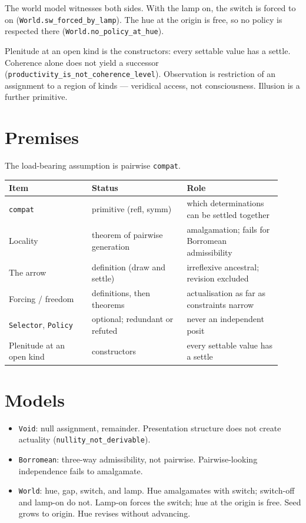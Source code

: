 \documentclass[11pt]{article}
\theoremstyle{definition}
\newcommand{\lean}[1]{\nolinkurl{#1}}
\begin{document}
The world model witnesses both sides. With the lamp on, the switch is
forced to on (\lean{World.sw\_forced\_by\_lamp}). The hue at the origin
is free, so no policy is respected there
(\lean{World.no\_policy\_at\_hue}).

Plenitude at an open kind is the constructors: every settable value has
a settle. Coherence alone does not yield a successor
(\lean{productivity\_is\_not\_coherence\_level}). Observation is
restriction of an assignment to a region of kinds --- veridical
access, not consciousness. Illusion is a further primitive.

\section{Premises}

The load-bearing assumption is pairwise \lean{compat}.

\begin{center}
\small
\begin{tabular}{@{}>{\raggedright\arraybackslash}p{0.28\linewidth}
  >{\raggedright\arraybackslash}p{0.32\linewidth}
  >{\raggedright\arraybackslash}p{0.32\linewidth}@{}}
\toprule
Item & Status & Role \\
\midrule
\lean{compat}
  & primitive (refl, symm)
  & which determinations can be settled together \\
Locality
  & theorem of pairwise generation
  & amalgamation; fails for Borromean admissibility \\
The arrow
  & definition (draw and settle)
  & irreflexive ancestral; revision excluded \\
Forcing / freedom
  & definitions, then theorems
  & actualisation as far as constraints narrow \\
\lean{Selector}, \lean{Policy}
  & optional; redundant or refuted
  & never an independent posit \\
Plenitude at an open kind
  & constructors
  & every settable value has a settle \\
\bottomrule
\end{tabular}
\end{center}

\section{Models}

\begin{itemize}
  \item \lean{Void}: null assignment, remainder. Presentation structure
        does not create actuality
        (\lean{nullity\_not\_derivable}).
  \item \lean{Borromean}: three-way admissibility, not pairwise.
        Pairwise-looking independence fails to amalgamate.
  \item \lean{World}: hue, gap, switch, and lamp. Hue amalgamates with
        switch; switch-off and lamp-on do not. Lamp-on forces the
        switch; hue at the origin is free. Seed grows to origin.
        Hue revises without advancing.
\end{itemize}
\end{document}

